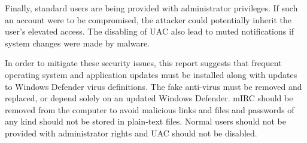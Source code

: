 Finally, standard users are being provided with administrator privileges. If such an account were to be compromised, the attacker could potentially inherit the user's elevated access. The disabling of UAC also lead to muted notifications if system changes were made by malware.

In order to mitigate these security issues, this report suggests that frequent operating system and application updates must be installed along with updates to Windows Defender virus definitions. The fake anti-virus must be removed and replaced, or depend solely on an updated Windows Defender. mIRC should be removed from the computer to avoid malicious links and files and passwords of any kind should not be stored in plain-text files. Normal users should not be provided with administrator rights and UAC should not be disabled.


